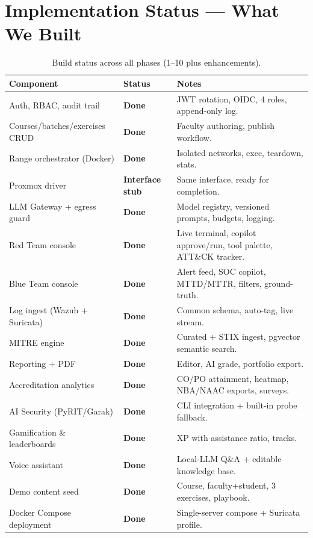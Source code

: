 \documentclass[11pt,a4paper]{article}
\begin{document}
\section{Implementation Status --- What We Built}
\begin{table}[h]
\centering
\small
\begin{tabular}{@{}p{5.2cm}p{3.0cm}p{6.0cm}@{}}
\toprule
\textbf{Component} & \textbf{Status} & \textbf{Notes}\\
\midrule
Auth, RBAC, audit trail & \textbf{Done} & JWT rotation, OIDC, 4 roles, append-only log.\\
Courses/batches/exercises CRUD & \textbf{Done} & Faculty authoring, publish workflow.\\
Range orchestrator (Docker) & \textbf{Done} & Isolated networks, exec, teardown, stats.\\
Proxmox driver & \textbf{Interface stub} & Same interface, ready for completion.\\
LLM Gateway + egress guard & \textbf{Done} & Model registry, versioned prompts, budgets, logging.\\
Red Team console & \textbf{Done} & Live terminal, copilot approve/run, tool palette, ATT\&CK tracker.\\
Blue Team console & \textbf{Done} & Alert feed, SOC copilot, MTTD/MTTR, filters, ground-truth.\\
Log ingest (Wazuh + Suricata) & \textbf{Done} & Common schema, auto-tag, live stream.\\
MITRE engine & \textbf{Done} & Curated + STIX ingest, pgvector semantic search.\\
Reporting + PDF & \textbf{Done} & Editor, AI grade, portfolio export.\\
Accreditation analytics & \textbf{Done} & CO/PO attainment, heatmap, NBA/NAAC exports, surveys.\\
AI Security (PyRIT/Garak) & \textbf{Done} & CLI integration + built-in probe fallback.\\
Gamification \& leaderboards & \textbf{Done} & XP with assistance ratio, tracks.\\
Voice assistant & \textbf{Done} & Local-LLM Q\&A + editable knowledge base.\\
Demo content seed & \textbf{Done} & Course, faculty+student, 3 exercises, playbook.\\
Docker Compose deployment & \textbf{Done} & Single-server compose + Suricata profile.\\
\bottomrule
\end{tabular}
\caption{Build status across all phases (1--10 plus enhancements).}
\end{table}
\end{document}
